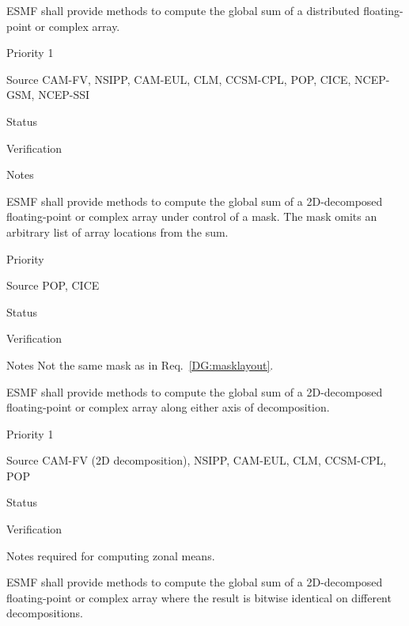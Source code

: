 
ESMF shall provide methods to compute the global sum of a distributed
floating-point or complex array.

\begin{reqlist}
\item[Priority] 1
\item[Source] CAM-FV, NSIPP, CAM-EUL, CLM, CCSM-CPL, POP, CICE, NCEP-GSM, NCEP-SSI
\item[Status]
\item[Verification]
\item[Notes]
\end{reqlist}

 \label{DG:masksum}

ESMF shall provide methods to compute the global sum of a 2D-decomposed
floating-point or complex array under control of a mask. The mask
omits an arbitrary list of array locations from the sum.

\begin{reqlist}
\item[Priority]
\item[Source] POP, CICE
\item[Status]
\item[Verification]
\item[Notes] Not the same mask as in Req.~\ref{DG:masklayout}.
\end{reqlist}


ESMF shall provide methods to compute the global sum of a 2D-decomposed
floating-point or complex array along either axis of decomposition.

\begin{reqlist}
\item[Priority] 1
\item[Source] CAM-FV (2D decomposition), NSIPP, CAM-EUL, CLM, CCSM-CPL, POP
\item[Status]
\item[Verification]
\item[Notes] required for computing zonal means.
\end{reqlist}


ESMF shall provide methods to compute the global sum of a
2D-decomposed floating-point or complex array where the result is
bitwise identical on different decompositions.

